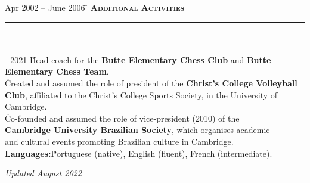 \documentclass[11pt,a4paper]{article}
\begin{document}
\begin{tabbing}
Apr 2002 -- June 2006 \=\kill
\> \textbf{\large{\textsc{Additional Activities}}} \\
\> \noindent\rule{11cm}{1pt}\\
\\
 - 2021 \' Head coach for the \textbf{Butte Elementary Chess Club} and \textbf{Butte Elementary Chess Team}. \\[2mm]
  \' Created and assumed the role of president of the \textbf{Christ's College Volleyball} \\ 
\> \textbf{Club}, affiliated to the Christ's College Sports Society, in the University of \\ \> Cambridge. \\ [2mm]
 \' Co-founded and assumed the role of vice-president (2010)
of the \\ \> \textbf{Cambridge University Brazilian Society}, which organises academic \\ 
\>and cultural events promoting Brazilian culture in Cambridge. \\ [5mm]
\> \textbf{Languages:}\' Portuguese (native), English (fluent), French (intermediate). \\  
\end{tabbing}
\vspace*{\fill}
\hspace{3.5cm} \textit{Updated August 2022}
\end{document}
